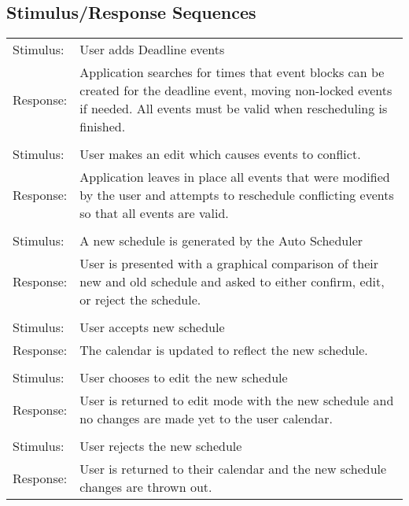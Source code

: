 \documentclass{scrreprt}
\begin{document}
\subsection{Stimulus/Response Sequences}
\begin{center}
\begin{tabular}{ p{2cm} p{13cm} }
Stimulus: & User adds Deadline events\\
Response: & Application searches for times that event blocks can be created for
the deadline event, moving non-locked events if needed.  All events must be valid
when rescheduling is finished.\\
\\
Stimulus: & User makes an edit which causes events to conflict.\\
Response: & Application leaves in place all events that were modified by the user
and attempts to reschedule conflicting events so that all events are valid.\\
\\
Stimulus: & A new schedule is generated by the Auto Scheduler\\
Response: & User is presented with a graphical comparison of their new and old
schedule and asked to either confirm, edit, or reject the schedule.\\
\\
Stimulus: & User accepts new schedule\\
Response: & The calendar is updated to reflect the new schedule.\\
\\
Stimulus: & User chooses to edit the new schedule\\
Response: & User is returned to edit mode with the new schedule and no changes
are made yet to the user calendar.\\
\\
Stimulus: & User rejects the new schedule\\
Response: & User is returned to their calendar and the new schedule changes
are thrown out.\\
\end{tabular}
\end{center}
\end{document}
